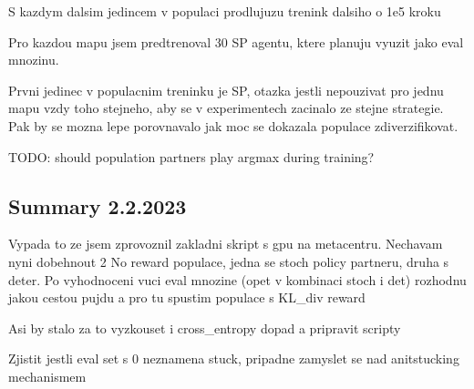 \documentclass{report}
\begin{document}
\begin{list}{}{}
    \item S kazdym dalsim jedincem v populaci prodlujuzu trenink dalsiho o 1e5 kroku
    \item Pro kazdou mapu jsem predtrenoval 30 SP agentu, ktere planuju vyuzit jako eval mnozinu.
    \item Prvni jedinec v populacnim treninku je SP, otazka jestli nepouzivat pro jednu mapu vzdy toho stejneho, aby se v experimentech zacinalo ze stejne strategie. Pak by se mozna lepe porovnavalo jak moc se dokazala populace zdiverzifikovat.
    \item TODO: should population partners play argmax during training?
\end{list}

\subsection{Summary 2.2.2023}
\begin{list}{}{}
    \item Vypada to ze jsem zprovoznil zakladni skript s gpu na metacentru. Nechavam nyni dobehnout 2 No reward populace, jedna se stoch policy partneru, druha s deter. 
    Po vyhodnoceni vuci eval mnozine (opet v kombinaci stoch i det) rozhodnu jakou cestou pujdu a pro tu spustim populace s KL\_div reward
    \item Asi by stalo za to vyzkouset i cross\_entropy dopad a pripravit scripty
    \item Zjistit jestli eval set s 0 neznamena stuck, pripadne zamyslet se nad anitstucking mechanismem
\end{list}
\end{document}
